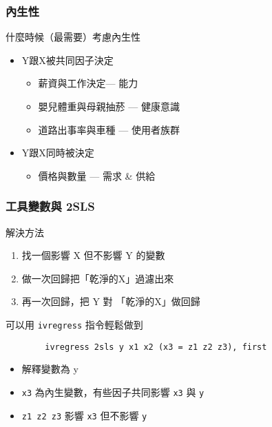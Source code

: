 \begin{frame}
    \frametitle{內生性}
    
    什麼時候（最需要）考慮內生性
    \begin{itemize}
        \item Y跟X被共同因子決定
        \begin{itemize}
            \item 薪資與工作決定--- 能力
            \item 嬰兒體重與母親抽菸 --- 健康意識
            \item 道路出事率與車種 --- 使用者族群
        \end{itemize}
        \item Y跟X同時被決定
        \begin{itemize}
            \item 價格與數量 --- 需求 \& 供給
        \end{itemize}
    \end{itemize}
\end{frame}

\begin{frame}[fragile]
    \frametitle{工具變數與 2SLS}
    解決方法
    \begin{enumerate}
        \item 找一個影響 X 但不影響 Y 的變數
        \item 做一次回歸把「乾淨的X」過濾出來
        \item 再一次回歸，把 Y 對 「乾淨的X」做回歸
    \end{enumerate}
    \vfill
    可以用 \texttt{ivregress} 指令輕鬆做到

    \begin{lstlisting}
        ivregress 2sls y x1 x2 (x3 = z1 z2 z3), first \end{lstlisting}
\begin{itemize}
    \item 解釋變數為 y
    \item \texttt{x3} 為內生變數，有些因子共同影響 \texttt{x3} 與 \texttt{y}
    \item \texttt{z1 z2 z3} 影響 \texttt{x3} 但不影響 \texttt{y}
\end{itemize}

\end{frame}


